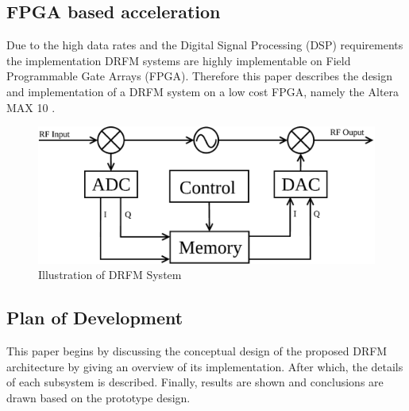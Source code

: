 	\subsection{FPGA based acceleration}
	\noindent Due to the high data rates and the Digital Signal Processing (DSP) requirements the implementation DRFM systems are highly implementable on Field Programmable Gate Arrays (FPGA). Therefore this paper describes the design and implementation of a DRFM system on a low cost FPGA, namely the Altera MAX 10 \cite{DE10lite}. 
	\begin{figure}[h!]
		\centering
		\includegraphics[width=0.8\linewidth]{img/DRFM_Intro}
		\caption{Illustration of DRFM System}
		\label{fig:DRFM_Intro}
	\end{figure}
	\subsection{Plan of Development}
	\noindent This paper begins by discussing the conceptual design of the proposed DRFM architecture by giving an overview of its implementation. After which, the details of each subsystem is described. Finally, results are shown and conclusions are drawn based on the prototype design.

		


